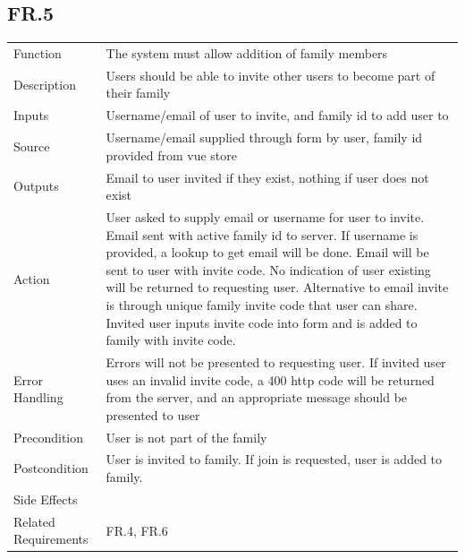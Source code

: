 \documentclass[12pt]{article}
\begin{document}
    \subsection*{FR.5}
    \begin{center}
        \begin{tabular}{| p{10em} p{26em} |}
        \hline
         Function & The system must allow addition of family members\\
         Description & Users should be able to invite other users to become part of their family\\
         Inputs & Username/email of user to invite, and family id to add user to\\
         Source & Username/email supplied through form by user, family id provided from vue store\\
         Outputs & Email to user invited if they exist, nothing if user does not exist\\
         Action & User asked to supply email or username for user to invite. Email sent with active family id to server. If username is provided, a lookup to get email will be done. Email will be sent to user with invite code. No indication of user existing will be returned to requesting user. Alternative to email invite is through unique family invite code that user can share. Invited user inputs invite code into form and is added to family with invite code.\\
         Error Handling & Errors will not be presented to requesting user. If invited user uses an invalid invite code, a 400 http code will be returned from the server, and an appropriate message should be presented to user\\
         Precondition & User is not part of the family\\
         Postcondition & User is invited to family. If join is requested, user is added to family.\\
         Side Effects & \\
         Related Requirements & FR.4, FR.6\\
         \hline
        \end{tabular}
    \end{center}
\end{document}
